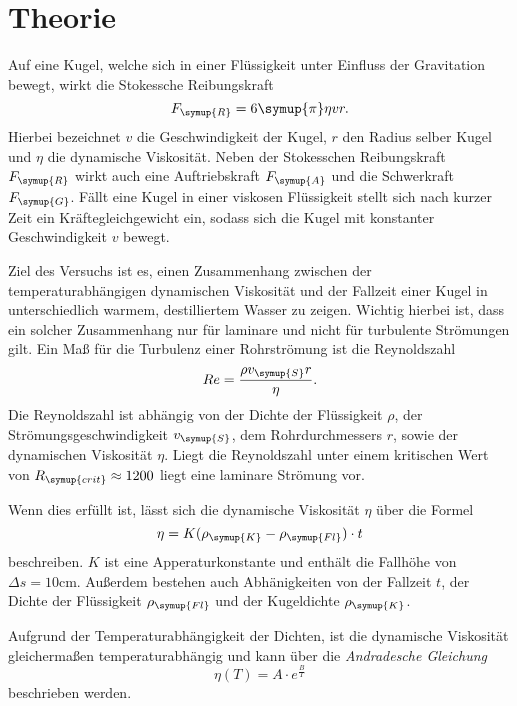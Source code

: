 \section{Theorie}
\label{sec:Theorie}
Auf eine Kugel, welche sich in einer Flüssigkeit unter Einfluss der Gravitation bewegt, wirkt die Stokessche Reibungskraft
\begin{equation}
    F_{\symup{R}}=6\symup{\pi}\eta v r.
\end{equation}
Hierbei bezeichnet $v$ die Geschwindigkeit der Kugel, $r$ den Radius selber Kugel und $\eta$ die dynamische Viskosität.
Neben der Stokesschen Reibungskraft $F_{\symup{R}}$ wirkt auch eine Auftriebskraft $F_{\symup{A}}$ und die Schwerkraft $F_{\symup{G}}$.
Fällt eine Kugel in einer viskosen Flüssigkeit stellt sich nach kurzer Zeit ein Kräftegleichgewicht ein, sodass sich die Kugel 
mit konstanter Geschwindigkeit $v$ bewegt.

Ziel des Versuchs ist es, einen Zusammenhang zwischen der temperaturabhängigen dynamischen Viskosität und der Fallzeit einer
Kugel in unterschiedlich warmem, destilliertem Wasser zu zeigen. Wichtig hierbei ist, dass ein solcher Zusammenhang nur für laminare
und nicht für turbulente Strömungen gilt. Ein Maß für die Turbulenz einer Rohrströmung ist die Reynoldszahl
\begin{equation}
    Re=\frac{\rho v_{\symup{S}}r}{\eta}.
\end{equation}
Die Reynoldszahl ist abhängig von der Dichte der Flüssigkeit $\rho$, der Strömungsgeschwindigkeit $v_{\symup{S}}$, dem 
Rohrdurchmessers $r$, sowie der dynamischen Viskosität $\eta$. Liegt die Reynoldszahl unter einem kritischen Wert von
$R_{\symup{crit}}\approx 1200$ \cite[341/B102]{czichos} liegt eine laminare Strömung vor.

Wenn dies erfüllt ist, lässt sich die dynamische Viskosität $\eta$ über die Formel
\begin{equation}
    \eta = K(\rho_{\symup{K}}-\rho_{\symup{Fl}})\cdot t
\end{equation}
beschreiben. $K$ ist eine Apperaturkonstante und enthält die Fallhöhe von $\Delta s=10\unit{\centi\metre}$. Außerdem
bestehen auch Abhänigkeiten von der Fallzeit $t$, der Dichte der Flüssigkeit $\rho_{\symup{Fl}}$ und der Kugeldichte
$\rho_{\symup{K}}$.

Aufgrund der Temperaturabhängigkeit der Dichten, ist die dynamische Viskosität gleichermaßen temperaturabhängig und kann über 
die \textit{Andradesche Gleichung}
\begin{equation}
    \eta (T)=A\cdot e^{\frac{B}{T}}
    \label{eqn:Andradesche Gleichung}
\end{equation}
beschrieben werden.



